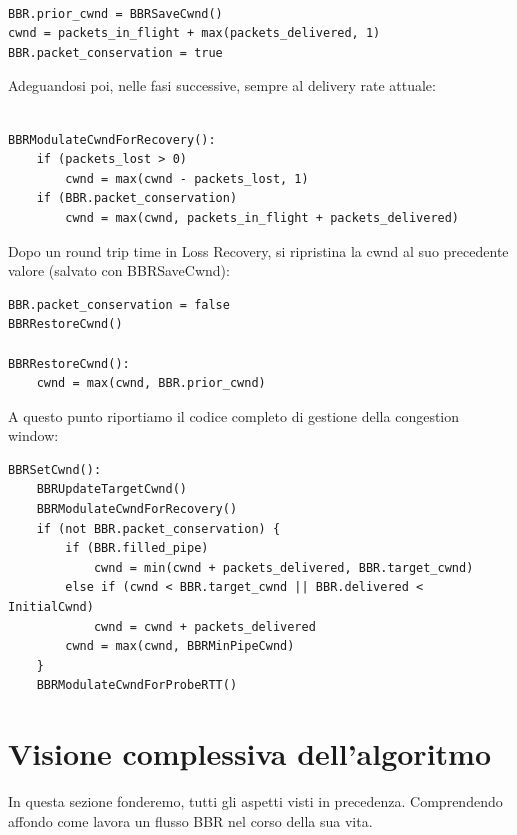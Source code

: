 \begin{lstlisting}[caption=BBR enter in loss recovery]

BBR.prior_cwnd = BBRSaveCwnd()
cwnd = packets_in_flight + max(packets_delivered, 1)
BBR.packet_conservation = true

\end{lstlisting}

Adeguandosi poi, nelle fasi successive, sempre al delivery rate attuale:

\begin{lstlisting}[caption=BBRModulateCwndForRecovery]

BBRModulateCwndForRecovery():
	if (packets_lost > 0)
   		cwnd = max(cwnd - packets_lost, 1)
	if (BBR.packet_conservation)
    	cwnd = max(cwnd, packets_in_flight + packets_delivered)

\end{lstlisting}

Dopo un round trip time in Loss Recovery, si ripristina la cwnd al suo precedente valore (salvato con BBRSaveCwnd):

\begin{lstlisting}[caption=BBR exit from loss recovery]
BBR.packet_conservation = false
BBRRestoreCwnd()

BBRRestoreCwnd():
	cwnd = max(cwnd, BBR.prior_cwnd)

\end{lstlisting}

A questo punto riportiamo il codice completo di gestione della congestion window:

\begin{lstlisting}[caption=BBRSetCwnd]
BBRSetCwnd():
	BBRUpdateTargetCwnd()
	BBRModulateCwndForRecovery()
	if (not BBR.packet_conservation) {
   		if (BBR.filled_pipe)
        	cwnd = min(cwnd + packets_delivered, BBR.target_cwnd)
		else if (cwnd < BBR.target_cwnd || BBR.delivered < InitialCwnd)
			cwnd = cwnd + packets_delivered
		cwnd = max(cwnd, BBRMinPipeCwnd)
    }
	BBRModulateCwndForProbeRTT()

\end{lstlisting}

\section{Visione complessiva dell'algoritmo}

In questa sezione fonderemo, tutti gli aspetti visti in precedenza. Comprendendo affondo come lavora un flusso BBR nel corso della sua vita. \bigskip

